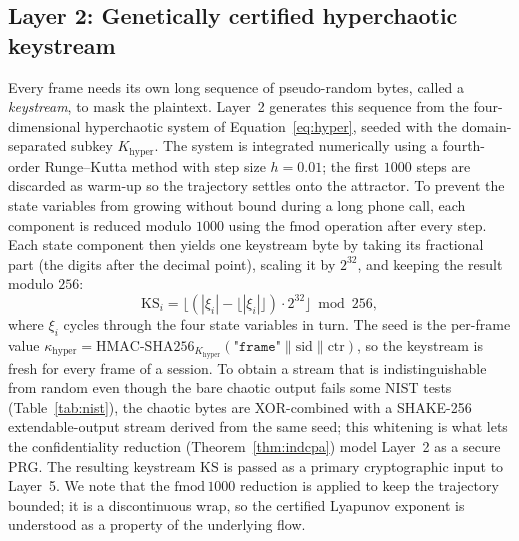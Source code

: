 \documentclass[pdflatex,sn-mathphys-num]{sn-jnl}%
\theoremstyle{thmstyleone}%
\theoremstyle{thmstyletwo}%
\theoremstyle{thmstylethree}%
\begin{document}
\subsection{Layer 2: Genetically certified hyperchaotic keystream}
\label{sec:layer2}

Every frame needs its own long sequence of pseudo-random bytes, called a \emph{keystream}, to mask the plaintext. Layer~2 generates this sequence from the four-dimensional hyperchaotic system of Equation~\eqref{eq:hyper}, seeded with the domain-separated subkey $K_{\mathrm{hyper}}$. The system is integrated numerically using a fourth-order Runge--Kutta method with step size $h=0.01$; the first $1000$ steps are discarded as warm-up so the trajectory settles onto the attractor. To prevent the state variables from growing without bound during a long phone call, each component is reduced modulo $1000$ using the $\mathrm{fmod}$ operation after every step. Each state component then yields one keystream byte by taking its fractional part (the digits after the decimal point), scaling it by $2^{32}$, and keeping the result modulo $256$:
\begin{equation}
\mathrm{KS}_i = \big\lfloor (|\xi_i| - \lfloor |\xi_i| \rfloor)\cdot 2^{32} \big\rfloor \bmod 256,
\label{eq:extract}
\end{equation}
where $\xi_i$ cycles through the four state variables in turn. The seed is the per-frame value $\kappa_{\mathrm{hyper}}=\mathrm{HMAC\text{-}SHA256}_{K_{\mathrm{hyper}}}(\texttt{"frame"}\|\mathrm{sid}\|\mathrm{ctr})$, so the keystream is fresh for every frame of a session. To obtain a stream that is indistinguishable from random even though the bare chaotic output fails some NIST tests (Table~\ref{tab:nist}), the chaotic bytes are XOR-combined with a SHAKE-256 extendable-output stream derived from the same seed; this whitening is what lets the confidentiality reduction (Theorem~\ref{thm:indcpa}) model Layer~2 as a secure PRG. The resulting keystream $\mathrm{KS}$ is passed as a primary cryptographic input to Layer~5. We note that the $\mathrm{fmod}\,1000$ reduction is applied to keep the trajectory bounded; it is a discontinuous wrap, so the certified Lyapunov exponent is understood as a property of the underlying flow.
\end{document}
